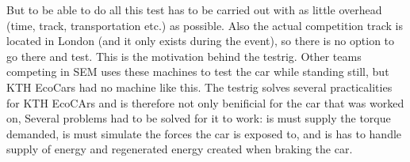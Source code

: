 But to be able to do all this test has to be carried out with as little overhead (time, track, transportation etc.) as possible. Also the actual competition track is located in London (and it only exists during the event), so there is no option to go there and test. This is the motivation behind the testrig. Other teams competing in SEM uses these machines to test the car while standing still, but KTH EcoCars had no machine like this. The testrig solves several practicalities for KTH EcoCArs and is therefore not only benificial for the car that was worked on, Several problems had to be solved for it to work: is must supply the torque demanded, is must simulate the forces the car is exposed to, and is has to handle supply of energy and regenerated energy created when braking the car.
